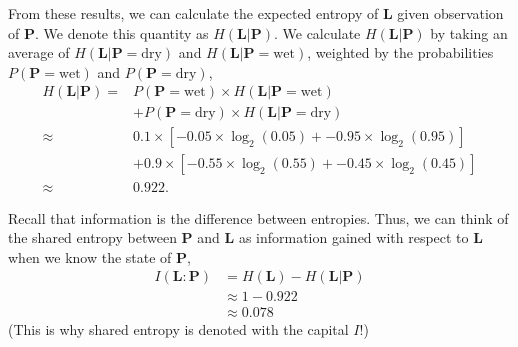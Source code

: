 From these results, we can calculate the expected entropy of $\bm{L}$ given observation of $\bm{P}$.
We denote this quantity as $H(\bm{L}|\bm{P})$.
We calculate $H(\bm{L}|\bm{P})$ by taking an average of $H(\bm{L} | \bm{P} = \text{dry})$ and $H(\bm{L} | \bm{P} = \text{wet})$, weighted by the probabilities $P(\bm{P} = \text{wet})$ and $P(\bm{P} = \text{dry})$,
\begin{align*}
H(\bm{L} | \bm{P})
=&
P(\bm{P} = \text{wet}) \times H(\bm{L} | \bm{P} = \text{wet}) \\
&+ P(\bm{P} = \text{dry}) \times H(\bm{L} | \bm{P} = \text{dry}) \\
\approx& 0.1 \times [ - 0.05 \times \log_2(0.05) + - 0.95 \times \log_2(0.95) ] \\
&+ 0.9 \times [ - 0.55 \times \log_2(0.55) + - 0.45 \times \log_2(0.45) ] \\
\approx& 0.922.
\end{align*}

Recall that information is the difference between entropies.
Thus, we can think of the shared entropy between $\bm{P}$ and $\bm{L}$ as information gained with respect to $\bm{L}$ when we know the state of $\bm{P}$,
\begin{align*}
I(\bm{L} : \bm{P})
&=
H(\bm{L}) - H(\bm{L} | \bm{P}) \\
&\approx
1 - 0.922 \\
&\approx
0.078
\end{align*}
(This is why shared entropy is denoted with the capital $I$!)

